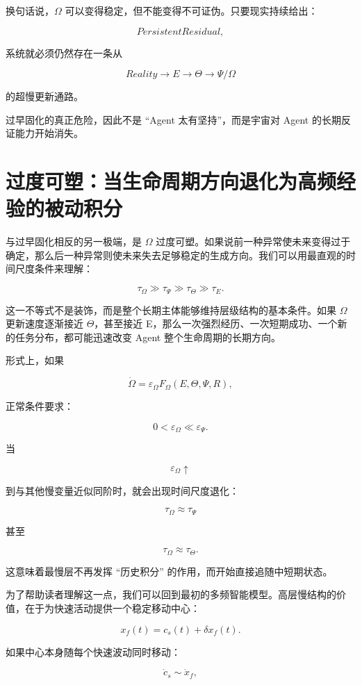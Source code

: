 换句话说，$\Omega$ 可以变得稳定，但不能变得不可证伪。只要现实持续给出：

\[
PersistentResidual,
\]

系统就必须仍然存在一条从

\[
Reality
\rightarrow
E
\rightarrow
\Theta
\rightarrow
\Psi/\Omega
\]

的超慢更新通路。

过早固化的真正危险，因此不是 ``Agent 太有坚持''，而是宇宙对 Agent 的长期反证能力开始消失。

\section{过度可塑：当生命周期方向退化为高频经验的被动积分}
\label{sec:omega_overplasticity}

与过早固化相反的另一极端，是 $\Omega$ 过度可塑。如果说前一种异常使未来变得过于确定，那么后一种异常则使未来失去足够稳定的生成方向。我们可以用最直观的时间尺度条件来理解：

\[
\tau_{\Omega}
\gg
\tau_{\Psi}
\gg
\tau_{\Theta}
\gg
\tau_E.
\]

这一不等式不是装饰，而是整个长期主体能够维持层级结构的基本条件。如果 $\Omega$ 更新速度逐渐接近 $\Theta$，甚至接近 E，那么一次强烈经历、一次短期成功、一个新的任务分布，都可能迅速改变 Agent 整个生命周期的长期方向。

形式上，如果

\[
\dot{\Omega}
=
\varepsilon_{\Omega}
F_{\Omega}(E,\Theta,\Psi,R),
\]

正常条件要求：

\[
0<\varepsilon_{\Omega}\ll\varepsilon_{\Psi}.
\]

当

\[
\varepsilon_{\Omega}
\uparrow
\]

到与其他慢变量近似同阶时，就会出现时间尺度退化：

\[
\tau_{\Omega}
\approx
\tau_{\Psi}
\]

甚至

\[
\tau_{\Omega}
\approx
\tau_{\Theta}.
\]

这意味着最慢层不再发挥 ``历史积分'' 的作用，而开始直接追随中短期状态。

为了帮助读者理解这一点，我们可以回到最初的多频智能模型。高层慢结构的价值，在于为快速活动提供一个稳定移动中心：

\[
x_f(t)
=
c_s(t)
+
\delta x_f(t).
\]

如果中心本身随每个快速波动同时移动：

\[
\dot c_s
\sim
\dot x_f,
\]

